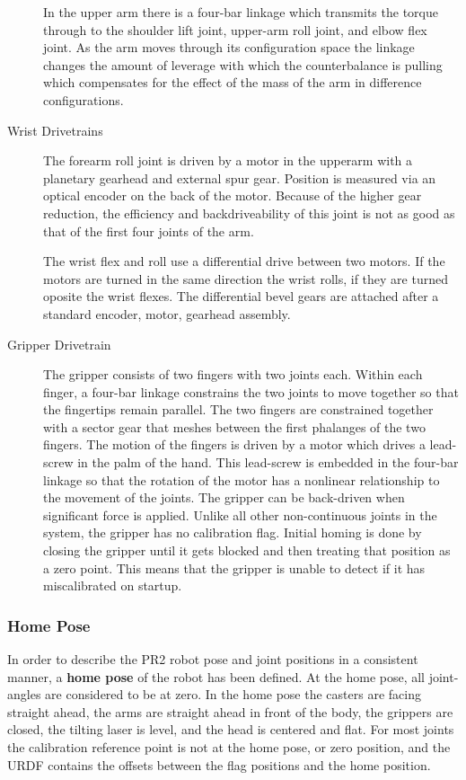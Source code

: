 \begin{description}
In the upper arm there is a four-bar linkage which transmits the torque through
to the shoulder lift joint, upper-arm roll joint, and elbow flex joint.  As the
arm moves through its configuration space the linkage changes the amount of
leverage with which the counterbalance is pulling which compensates for the
effect of the mass of the arm in difference configurations.

\item[Wrist Drivetrains] The forearm roll joint is driven by a motor in the
  upperarm with a planetary gearhead and external spur gear.  Position is
  measured via an optical encoder on the back of the motor.  Because of the
  higher gear reduction, the efficiency and backdriveability of this joint is
  not as good as that of the first four joints of the arm.

The wrist flex and roll use a differential drive between two motors.  If the
motors are turned in the same direction the wrist rolls, if they are turned
oposite the wrist flexes.  The differential bevel gears are attached after a
standard encoder, motor, gearhead assembly.


\item[Gripper Drivetrain] The gripper consists of two fingers with two joints
  each.  Within each finger, a four-bar linkage constrains the two joints to
  move together so that the fingertips remain parallel.  The two fingers are
  constrained together with a sector gear that meshes between the first
  phalanges of the two fingers.  The motion of the fingers is driven by a motor
  which drives a lead-screw in the palm of the hand.  This lead-screw is
  embedded in the four-bar linkage so that the rotation of the motor has a
  nonlinear relationship to the movement of the joints.  The gripper can be
  back-driven when significant force is applied.  Unlike all other
  non-continuous joints in the system, the gripper has no calibration flag.
  Initial homing is done by closing the gripper until it gets blocked and then
  treating that position as a zero point.  This means that the gripper is unable
  to detect if it has miscalibrated on startup.

\end{description}


\subsubsection{Home Pose}
In order to describe the PR2 robot pose and joint positions in a consistent
manner, a {\bf home pose} of the robot has been defined.  At the home pose,
all joint-angles are considered to be at zero.  In the home pose the casters
are facing straight ahead, the arms are straight ahead in front of the body,
the grippers are closed, the tilting laser is level, and the head is centered
and flat.  For most joints the calibration reference point is not at the home
pose, or zero position, and the URDF contains the offsets between the flag
positions and the home position.

